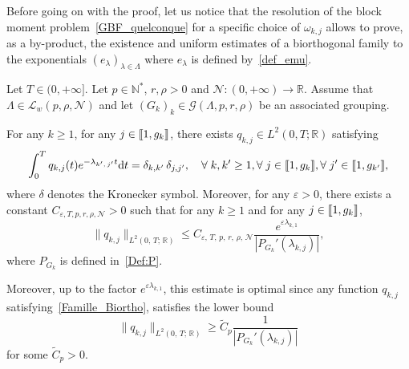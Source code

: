 \documentclass[10pt]{amsart}
\theoremstyle{definition}\newtheorem{defi}[theo]{Definition}\newtheorem{rema}[theo]{Remark}\newtheorem{exam}[theo]{Example}\newtheorem{exem}[theo]{Example}\newtheorem{nota}[theo]{Notation}
\newcommand{\llbracket}{\mathopen{[\mkern -2.7mu[}}
\newcommand{\rrbracket}{\mathclose{]\mkern -2.7mu]}}
\newcommand{\inter}[2]{\llbracket #1,#2 \rrbracket}
\newcommand{\n}{g}
\newcommand{\LL}{\mathcal{L}}
\newcommand{\NN}{\mathcal{N}}
\newcommand{\N}{\mathbb{N}}
\newcommand{\R}{\mathbb{R}}
\newcommand{\md}{\mathrm{d}}
\let\oldforall\forall
\renewcommand*{\forall}{\mathrel{\oldforall}}
\begin{document}
Before going on with the proof, let us notice that the resolution of the block moment problem~\eqref{GBF_quelconque} for a specific choice of $\omega_{k,j}$ allows to prove, as a by-product, the existence and uniform estimates of a biorthogonal family to the exponentials $(e_\lambda)_{ \lambda \in \Lambda}$ where $e_\lambda$ is defined by~\eqref{def_emu}.
\begin{coro} \label{Coro:FamilleBiorthogonale}
Let $T \in (0,+\infty]$. Let $p \in \N^*$, $r, \rho > 0$ and $\NN : (0,+\infty) \to \R$. Assume that $\Lambda \in \LL_w(p,\rho, \NN)$ and let $(G_k)_k\in \mathcal{G}(\Lambda,p,r,\rho)$ be an associated grouping.

For any $k \geq 1$, for any $j \in \inter{1}{\n_k}$, there exists $q_{k,j} \in L^2(0,T ; \R)$ satisfying
\begin{equation}\label{Famille_Biortho}
\int_0^T q_{k,j}(t) e^{-\lambda_{k',\,j'} t } \md t = \delta_{k,k'}\,\delta_{j,j'}, \quad \forall k, k' \geq 1, \forall j \in \inter{1}{\n_{k}}, \forall j' \in \inter{1}{\n_{k'}},
\end{equation}
where $\delta$ denotes the Kronecker symbol. Moreover, for any $\varepsilon > 0$, there exists a constant $C_{\varepsilon, T, p, r, \rho, \NN} >0$ such that for any $k \geq 1$ and for any $j \in \inter{1}{\n_k}$,
\begin{equation*}\label{Estimee_Famille_Biortho}
\| q_{k,j} \|_{L^2(0,\,T ;\,\R)} \leq C_{\varepsilon,\,T,\,p,\,r,\,\rho,\,\NN} \frac{e^{\varepsilon \lambda_{k,1}}}{\left| P_{G_k}'(\lambda_{k,j}) \right| },
\end{equation*}
where $P_{G_k}$ is defined in~\eqref{Def:P}.

Moreover, up to the factor $e^{\varepsilon \lambda_{k,1}}$, this estimate is optimal since any function $q_{k,j}$ satisfying~\eqref{Famille_Biortho}, satisfies the lower bound
\[
\| q_{k,j} \|_{L^2(0,\,T ;\,\R)} \geq \widetilde{C}_{p} \frac{1}{\left| P_{G_k}'(\lambda_{k,j}) \right| }
\]
for some $\widetilde{C}_p >0$.
\end{coro}
\end{document}
